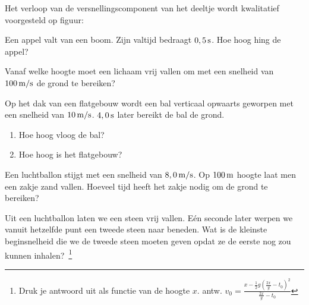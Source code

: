 \begin{exercise} Het verloop van de versnellingscomponent van het deeltje wordt kwalitatief voorgesteld op figuur:
%
%





\end{exercise}

\begin{exercise} Een appel valt van een boom. Zijn valtijd bedraagt $0,5\rm\,s$. Hoe hoog hing de appel?



\end{exercise}

\begin{exercise} Vanaf welke hoogte moet een lichaam vrij vallen om met een snelheid van $100\rm\,m/s$ de grond te bereiken?



\end{exercise}

\begin{exercise} Op het dak van een flatgebouw wordt een bal verticaal
opwaarts geworpen met een snelheid van $10\rm\,m/s$. $4,0\rm\,s$
later bereikt de bal de grond.
\begin{enumerate}
\item Hoe hoog vloog de bal?
\item Hoe hoog is het flatgebouw?
\end{enumerate}

\end{exercise}

\begin{exercise} Een luchtballon stijgt met een snelheid van $8,0\rm\,m/s$. Op
$100\rm\,m$ hoogte laat men een zakje zand vallen. Hoeveel tijd
heeft het zakje nodig om de grond te bereiken?

\end{exercise}

\begin{exercise} Uit een luchtballon laten we een steen vrij vallen. E\'en
seconde later werpen we vanuit hetzelfde punt een tweede steen naar
beneden. Wat is de kleinste beginsnelheid die we de tweede steen
moeten geven opdat ze de eerste nog zou kunnen
inhalen?~\footnote{Druk je antwoord uit als functie van de hoogte
$x$. antw.
$v_0=\frac{x-\frac{1}{2}g(\frac{2x}{g}-t_0)^2}{\frac{2x}{g}-t_0}$}

\end{exercise}

